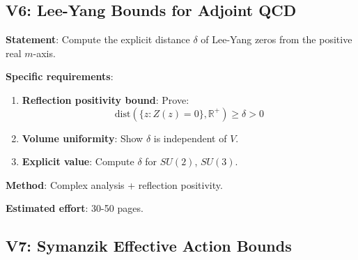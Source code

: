 \subsection{V6: Lee-Yang Bounds for Adjoint QCD}

\begin{verification}
\textbf{Statement}: Compute the explicit distance $\delta$ of Lee-Yang zeros 
from the positive real $m$-axis.

\textbf{Specific requirements}:
\begin{enumerate}
\item \textbf{Reflection positivity bound}: Prove:
\begin{equation}
\text{dist}(\{z : Z(z) = 0\}, \mathbb{R}^+) \geq \delta > 0
\end{equation}

\item \textbf{Volume uniformity}: Show $\delta$ is independent of $V$.

\item \textbf{Explicit value}: Compute $\delta$ for $SU(2)$, $SU(3)$.
\end{enumerate}

\textbf{Method}: Complex analysis + reflection positivity.

\textbf{Estimated effort}: 30-50 pages.
\end{verification}

\subsection{V7: Symanzik Effective Action Bounds}


